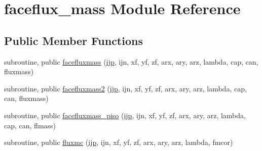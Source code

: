 \hypertarget{classfaceflux__mass}{\section{faceflux\-\_\-mass Module Reference}
\label{classfaceflux__mass}
}
\subsection*{Public Member Functions}
\begin{DoxyCompactItemize}
\item 
subroutine, public \hyperlink{classfaceflux__mass_adbb67f102fcdca57912e60bf8eaf75a4}{facefluxmass} (\hyperlink{CourantNo_8h_accea320a458bb8759c7ece360e05ddf4}{ijp}, ijn, xf, yf, zf, arx, ary, arz, lambda, cap, can, fluxmass)
\item 
subroutine, public \hyperlink{classfaceflux__mass_af0a6454f25b95c4c5586c8a25b31b073}{facefluxmass2} (\hyperlink{CourantNo_8h_accea320a458bb8759c7ece360e05ddf4}{ijp}, ijn, xf, yf, zf, arx, ary, arz, lambda, cap, can, fluxmass)
\item 
subroutine, public \hyperlink{classfaceflux__mass_ae73f110c08fa18ca7bb48808f22781a3}{facefluxmass\-\_\-piso} (\hyperlink{CourantNo_8h_accea320a458bb8759c7ece360e05ddf4}{ijp}, ijn, xf, yf, zf, arx, ary, arz, lambda, cap, can, flmass)
\item 
subroutine, public \hyperlink{classfaceflux__mass_a10e4d5e3230667bd512b3dbea8eba78b}{fluxmc} (\hyperlink{CourantNo_8h_accea320a458bb8759c7ece360e05ddf4}{ijp}, ijn, xf, yf, zf, arx, ary, arz, lambda, fmcor)
\end{DoxyCompactItemize}


